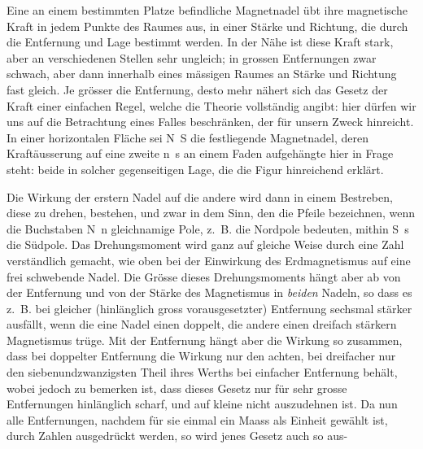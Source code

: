 Eine an einem bestimmten Platze befindliche Magnetnadel übt ihre magnetische Kraft in jedem Punkte des Raumes aus, in einer Stärke und Richtung, die durch die Entfernung und Lage bestimmt werden. In der Nähe ist diese Kraft stark, aber an verschiedenen Stellen sehr ungleich; in grossen Entfernungen zwar schwach, aber dann innerhalb eines mässigen Raumes an Stärke und Richtung fast gleich. Je grösser die Entfernung, desto mehr nähert sich das Gesetz der Kraft einer einfachen Regel, welche die Theorie vollständig angibt: hier dürfen wir uns auf die Betrachtung eines Falles beschränken, der für unsern Zweck hinreicht. In einer horizontalen Fläche sei N~S die festliegende Magnetnadel, deren Kraftäusserung auf eine zweite n~s an einem Faden aufgehängte hier in Frage steht: beide in solcher gegenseitigen Lage, die die Figur hinreichend erklärt.
\begin{center}
\resizebox{.50\textwidth}{!}{}
\end{center}
Die Wirkung der erstern Nadel auf die andere wird dann in einem Bestreben, diese zu drehen, bestehen, und zwar in dem Sinn, den die Pfeile bezeichnen, wenn die Buchstaben N~n gleichnamige Pole, z.~B. die Nordpole bedeuten, mithin S~s die Südpole. Das Drehungsmoment wird ganz auf gleiche Weise durch eine Zahl verständlich gemacht, wie oben bei der Einwirkung des Erdmagnetismus auf eine frei schwebende Nadel. Die Grösse dieses Drehungsmoments hängt aber ab von der Entfernung und von der Stärke des Magnetismus in \textit{beiden} Nadeln, so dass es z.~B. bei gleicher (hinlänglich gross vorausgesetzter) Entfernung sechsmal stärker ausfällt, wenn die eine Nadel einen doppelt, die andere einen dreifach stärkern Magnetismus trüge. Mit der Entfernung hängt aber die Wirkung so zusammen, dass bei doppelter Entfernung die Wirkung nur den achten, bei dreifacher nur den siebenundzwanzigsten Theil ihres Werths bei einfacher Entfernung behält, wobei jedoch zu bemerken ist, dass dieses Gesetz nur für sehr grosse Entfernungen hinlänglich scharf, und auf kleine nicht auszudehnen ist. Da nun alle Entfernungen, nachdem für sie einmal ein Maass als Einheit gewählt ist, durch Zahlen ausgedrückt werden, so wird jenes Gesetz auch so aus-
\par\clearpage
{}
